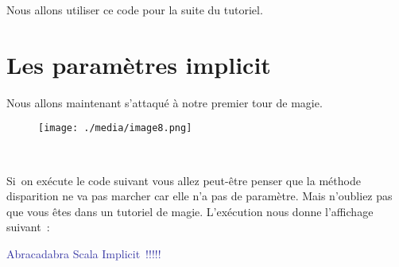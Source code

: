 \documentclass[12pt]{article}
\begin{document}

\par


\vspace{\baselineskip}
Nous allons utiliser ce code pour la suite du tutoriel.\par

 \par

\section*{Les paramètres implicit}

\vspace{\baselineskip}
Nous allons maintenant s’attaqué à notre premier tour de magie. \par


\vspace{\baselineskip}



\begin{figure}[H]
	\begin{Center}
		\texttt{[image: ./media/image8.png]}
	\end{Center}
\end{figure}



\begin{Center}
\ \ \ \ \ \ \ \ \ \ \ \ \ \ \ \ \ \ \ \ \ \ \ \ \ \ \ \ \ \ \ \ \ \ \ \ \ \
\end{Center}\par


\vspace{\baselineskip}
Si\ on exécute le code suivant vous allez peut-être penser que la méthode disparition ne va pas marcher car elle n’a pas de paramètre.  Mais n’oubliez pas que vous êtes dans un tutoriel de magie. L’exécution nous donne l’affichage suivant :\par


\vspace{\baselineskip}
\begin{Center}
{\fontsize{28pt}{33.6pt}\selectfont \textcolor[HTML]{3030A0}{Abracadabra Scala Implicit !!!!!}\par}
\end{Center}\par
\end{document}
